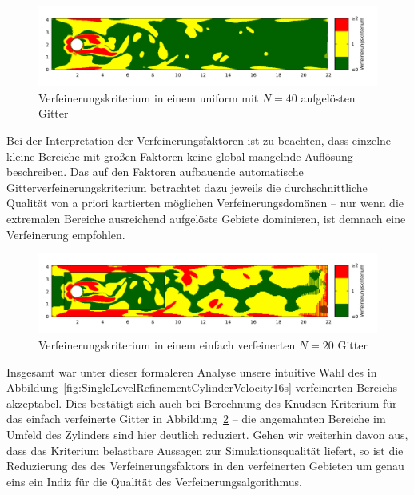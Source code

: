 \begin{figure}[H]
\begin{adjustbox}{center}
\includegraphics[width=1.2\textwidth]{img/static/cylinder2d_unrefined_n40_re100_16s_knudsen.pdf}
\end{adjustbox}
\caption{Verfeinerungskriterium in einem uniform mit \(N=40\) aufgelösten Gitter}
\label{fig:UnrefinedCylinderKnudsenN4060s}
\end{figure}

Bei der Interpretation der Verfeinerungsfaktoren ist zu beachten, dass einzelne kleine Bereiche mit großen Faktoren keine global mangelnde Auflösung beschreiben. Das auf den Faktoren aufbauende automatische Gitterverfeinerungskriterium betrachtet dazu jeweils die durchschnittliche Qualität von a priori kartierten möglichen Verfeinerungsdomänen -- nur wenn die extremalen Bereiche ausreichend aufgelöste Gebiete dominieren, ist demnach eine Verfeinerung empfohlen.

\begin{figure}[h]
\begin{adjustbox}{center}
\includegraphics[width=1.2\textwidth]{img/static/cylinder2d_single_refinement_n20_re100_16s_knudsen.pdf}
\end{adjustbox}
\caption{Verfeinerungskriterium in einem einfach verfeinerten \(N=20\) Gitter}
\label{fig:SingleLevelRefinementCylinderKnudsen16s}
\end{figure}

Insgesamt war unter dieser formaleren Analyse unsere intuitive Wahl des in Abbildung~\ref{fig:SingleLevelRefinementCylinderVelocity16s} verfeinerten Bereichs akzeptabel. Dies bestätigt sich auch bei Berechnung des Knudsen-Kriterium für das einfach verfeinerte Gitter in Abbildung~\ref{fig:SingleLevelRefinementCylinderKnudsen16s} -- die angemahnten Bereiche im Umfeld des Zylinders sind hier deutlich reduziert. Gehen wir weiterhin davon aus, dass das Kriterium belastbare Aussagen zur Simulationsqualität liefert, so ist die Reduzierung des des Verfeinerungsfaktors in den verfeinerten Gebieten um genau eins ein Indiz für die Qualität des Verfeinerungsalgorithmus.

